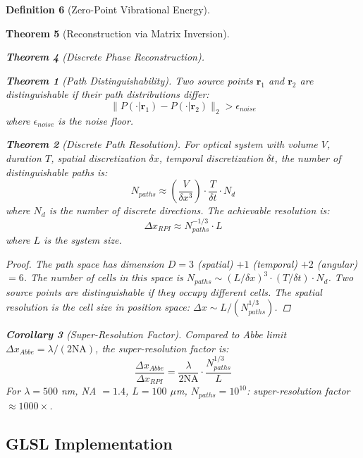 \documentclass[11pt,a4paper]{article}
\newtheorem{theorem}{Theorem}[section]
\newtheorem{corollary}[theorem]{Corollary}
\theoremstyle{definition}
\newtheorem{definition}[theorem]{Definition}
\theoremstyle{remark}
\begin{document}
\begin{definition}[Zero-Point Vibrational Energy]
\begin{theorem}[Reconstruction via Matrix Inversion]
\begin{theorem}[Discrete Phase Reconstruction]
\begin{theorem}[Path Distinguishability]
\label{thm:path_distinguishability}
Two source points $\mathbf{r}_1$ and $\mathbf{r}_2$ are distinguishable if their path distributions differ:
\begin{equation}
\|P(\cdot | \mathbf{r}_1) - P(\cdot | \mathbf{r}_2)\|_2 > \epsilon_{noise}
\end{equation}
where $\epsilon_{noise}$ is the noise floor.
\end{theorem}

\begin{theorem}[Discrete Path Resolution]
\label{thm:discrete_resolution}
For optical system with volume $V$, duration $T$, spatial discretization $\delta x$, temporal discretization $\delta t$, the number of distinguishable paths is:
\begin{equation}
N_{paths} \approx \left(\frac{V}{\delta x^3}\right) \cdot \frac{T}{\delta t} \cdot N_d
\end{equation}
where $N_d$ is the number of discrete directions. The achievable resolution is:
\begin{equation}
\Delta x_{RPI} \approx N_{paths}^{-1/3} \cdot L
\end{equation}
where $L$ is the system size.
\end{theorem}

\begin{proof}
The path space has dimension $D = 3$ (spatial) $+ 1$ (temporal) $+ 2$ (angular) $= 6$. The number of cells in this space is $N_{paths} \sim (L/\delta x)^3 \cdot (T/\delta t) \cdot N_d$. Two source points are distinguishable if they occupy different cells. The spatial resolution is the cell size in position space: $\Delta x \sim L / (N_{paths}^{1/3})$.
\end{proof}

\begin{corollary}[Super-Resolution Factor]
\label{cor:super_resolution_factor}
Compared to Abbe limit $\Delta x_{Abbe} = \lambda/(2 \text{NA})$, the super-resolution factor is:
\begin{equation}
\frac{\Delta x_{Abbe}}{\Delta x_{RPI}} = \frac{\lambda}{2 \text{NA}} \cdot \frac{N_{paths}^{1/3}}{L}
\end{equation}
For $\lambda = 500$ nm, NA $= 1.4$, $L = 100$ $\mu$m, $N_{paths} = 10^{10}$: super-resolution factor $\approx 1000\times$.
\end{corollary}

\subsection{GLSL Implementation}


\end{theorem}
\end{theorem}
\end{definition}
\end{document}
